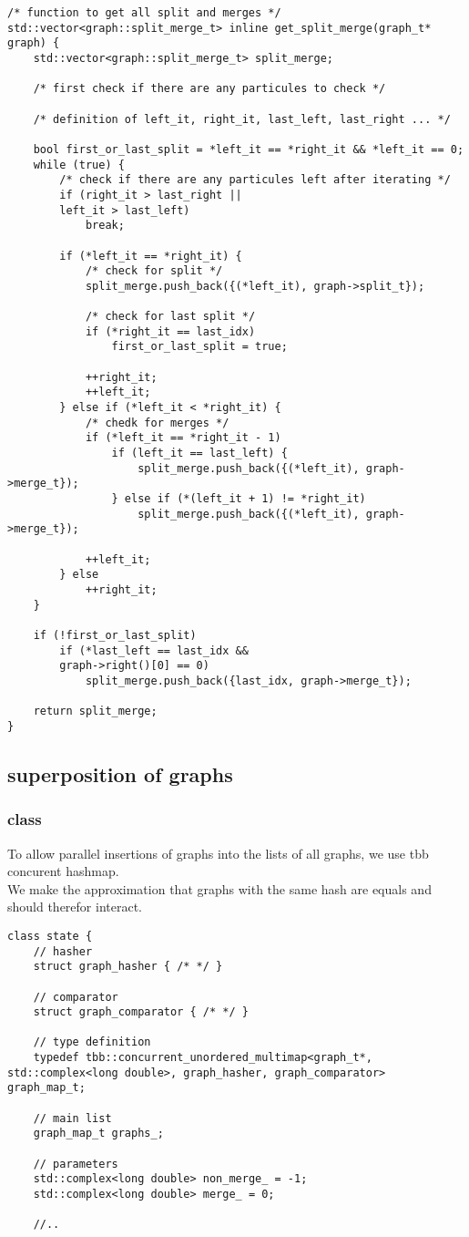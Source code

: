 \documentclass[11pt]{article}
\begin{document}
\begin{lstlisting}[style=CStyle]
/* function to get all split and merges */
std::vector<graph::split_merge_t> inline get_split_merge(graph_t* graph) {
	std::vector<graph::split_merge_t> split_merge;

	/* first check if there are any particules to check */

	/* definition of left_it, right_it, last_left, last_right ... */
	
	bool first_or_last_split = *left_it == *right_it && *left_it == 0;
	while (true) {
		/* check if there are any particules left after iterating */
		if (right_it > last_right ||
		left_it > last_left)
			break;

		if (*left_it == *right_it) {
			/* check for split */
			split_merge.push_back({(*left_it), graph->split_t});

			/* check for last split */
			if (*right_it == last_idx)
				first_or_last_split = true;

			++right_it;
			++left_it;
		} else if (*left_it < *right_it) {
			/* chedk for merges */
			if (*left_it == *right_it - 1)
				if (left_it == last_left) {
					split_merge.push_back({(*left_it), graph->merge_t});
				} else if (*(left_it + 1) != *right_it)
					split_merge.push_back({(*left_it), graph->merge_t});

			++left_it;
		} else
			++right_it;
	}
		
	if (!first_or_last_split)
		if (*last_left == last_idx &&
		graph->right()[0] == 0)
			split_merge.push_back({last_idx, graph->merge_t});

	return split_merge;
}
\end{lstlisting}

\subsection{superposition of graphs}

\subsubsection{class}

To allow parallel insertions of graphs into the lists of all graphs, we use tbb concurent hashmap. \\

We make the approximation that graphs with the same hash are equals and should therefor interact.

\begin{lstlisting}[style=CStyle]
class state {
	// hasher
	struct graph_hasher { /* */ }

	// comparator
	struct graph_comparator { /* */ }

	// type definition
	typedef tbb::concurrent_unordered_multimap<graph_t*, std::complex<long double>, graph_hasher, graph_comparator> graph_map_t;

	// main list 
	graph_map_t graphs_;

	// parameters
	std::complex<long double> non_merge_ = -1;
	std::complex<long double> merge_ = 0;
	
	//..
\end{lstlisting}
\end{document}
